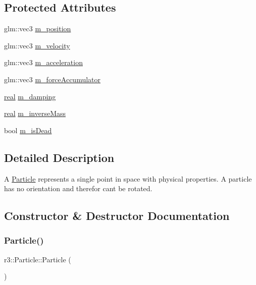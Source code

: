 \subsection*{Protected Attributes}
\begin{DoxyCompactItemize}
\item 
glm\+::vec3 \mbox{\hyperlink{classr3_1_1_particle_ab7f5aa7cf48278441aab18db1a0c1ba9}{m\+\_\+position}}
\item 
glm\+::vec3 \mbox{\hyperlink{classr3_1_1_particle_a037d73e42df0c7bb9f1ae79b37301477}{m\+\_\+velocity}}
\item 
glm\+::vec3 \mbox{\hyperlink{classr3_1_1_particle_aa6c9d639f87a9291c60165c057e05a4f}{m\+\_\+acceleration}}
\item 
glm\+::vec3 \mbox{\hyperlink{classr3_1_1_particle_accfbf52627c85fa26c4df442873df497}{m\+\_\+force\+Accumulator}}
\item 
\mbox{\hyperlink{namespacer3_ab2016b3e3f743fb735afce242f0dc1eb}{real}} \mbox{\hyperlink{classr3_1_1_particle_a68034523bad4d9e4023f69b849197eb3}{m\+\_\+damping}}
\item 
\mbox{\hyperlink{namespacer3_ab2016b3e3f743fb735afce242f0dc1eb}{real}} \mbox{\hyperlink{classr3_1_1_particle_aad38f3126d055c2677ffe8f08089fc5c}{m\+\_\+inverse\+Mass}}
\item 
bool \mbox{\hyperlink{classr3_1_1_particle_a0a04ce870abc9017f09c2564344fda82}{m\+\_\+is\+Dead}}
\end{DoxyCompactItemize}


\subsection{Detailed Description}
A \mbox{\hyperlink{classr3_1_1_particle}{Particle}} represents a single point in space with physical properties. A particle has no orientation and therefor can\textquotesingle{}t be rotated. 

\subsection{Constructor \& Destructor Documentation}
\mbox{\label{classr3_1_1_particle_a72d4ae82278e293bf0933a1aabbe9ac3}} 
\subsubsection{\texorpdfstring{Particle()}{Particle()}\hspace{0.1cm}{\footnotesize\ttfamily [1/2]}}
{\footnotesize\ttfamily r3\+::\+Particle\+::\+Particle (\begin{DoxyParamCaption}{ }\end{DoxyParamCaption})\hspace{0.3cm}{\ttfamily [explicit]}}



